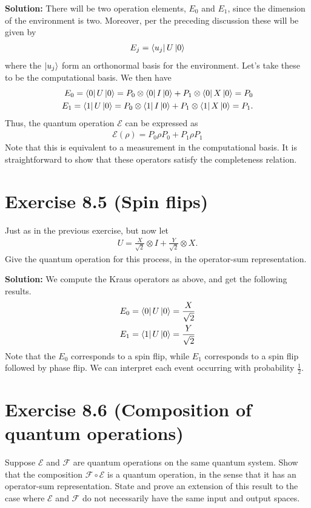 \documentclass{book}
\newcommand{\mc}[1]{\mathcal{#1}}
\begin{document}
    \textbf{Solution:} There will be two operation elements, $E_0$ and $E_1$, since the dimension of the environment is two. Moreover, per the preceding discussion these will be given by
    \begin{align}
        E_j = \bra{u_j}U\ket{0}
    \end{align}
    where the $\ket{u_j}$ form an orthonormal basis for the environment. Let's take these to be the computational basis. We then have
    \begin{align}
    \begin{aligned}
        E_0 = \bra{0}U\ket{0} = P_0\otimes \bra{0}I\ket{0} + P_1 \otimes \bra{0}X\ket{0} = P_0 \\
        E_1 = \bra{1}U\ket{0} = P_0\otimes \bra{1}I\ket{0} + P_1 \otimes \bra{1}X\ket{0} = P_1.
    \end{aligned}
    \end{align}
    Thus, the quantum operation $\mc{E}$ can be expressed as
    \begin{align}
        \mc{E}(\rho) = P_0 \rho P_0 + P_1 \rho P_1
    \end{align}
    Note that this is equivalent to a measurement in the computational basis. It is straightforward to show that these operators satisfy the completeness relation. 

\section*{Exercise 8.5 (Spin flips)}
    Just as in the previous exercise, but now let 
    \begin{align}
        U = \frac{X}{\sqrt{2}}\otimes I + \frac{Y}{\sqrt{2}}\otimes X.
    \end{align}
    Give the quantum operation for this process, in the operator-sum representation.
    
    \textbf{Solution:} We compute the Kraus operators as above, and get the following results.
    \begin{align}
        E_0 = \bra{0}U\ket{0} = \frac{X}{\sqrt{2}} \\
        E_1 = \bra{1}U\ket{0} = \frac{Y}{\sqrt{2}}
    \end{align}
    Note that the $E_0$ corresponds to a spin flip, while $E_1$ corresponds to a spin flip followed by phase flip. We can interpret each event occurring with probability $\frac{1}{2}$.
    
\section*{Exercise 8.6 (Composition of quantum operations)}
    Suppose $\mc{E}$ and $\mc{F}$ are quantum operations on the same quantum system. Show that the composition $\mc{F}\circ \mc{E}$ is a quantum operation, in the sense that it has an operator-sum representation. State and prove an extension of this result to the case where $\mc{E}$ and $\mc{F}$ do not necessarily have the same input and output spaces. 
    
\end{document}
